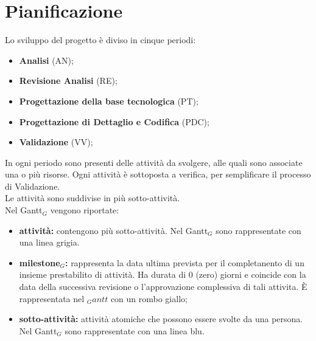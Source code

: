 \chapter{Pianificazione}
Lo sviluppo del progetto è diviso in cinque periodi:
\begin{itemize}
    \item \textbf{Analisi} (AN);
    \item \textbf{Revisione Analisi} (RE);
    \item \textbf{Progettazione della base tecnologica} (PT);
    \item \textbf{Progettazione di Dettaglio e Codifica} (PDC);
    \item \textbf{Validazione} (VV);
\end{itemize}
In ogni periodo sono presenti delle attività da svolgere, alle quali sono associate una o più risorse. Ogni attività è sottoposta a verifica, per semplificare il processo di Validazione.\\
Le attività sono suddivise in più sotto-attività.\\
Nel Gantt$_{G}$ vengono riportate:
\begin{itemize}
    \item \textbf{attività:} contengono più sotto-attività. Nel Gantt$_{G}$ sono rappresentate con una linea grigia.
    \item \textbf{milestone$_{G}$:} rappresenta la data ultima prevista per il completanento di un insieme prestabilito di attività. Ha durata di 0 (zero) giorni e coincide con la data della successiva revisione o l'approvazione complessiva di tali attivita. È rappresentata nel $_Gantt$ con un rombo giallo;
    \item \textbf{sotto-attività:} attività atomiche che possono essere svolte da una persona. Nel Gantt$_{G}$ sono rappresentate con una linea blu.  
\end{itemize}
